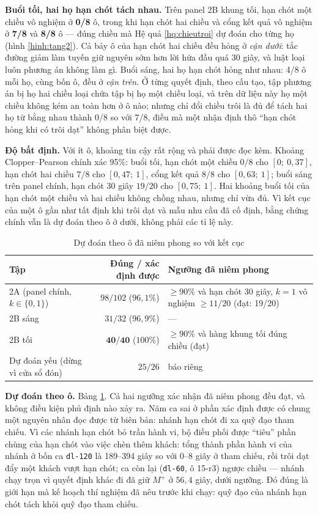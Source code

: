 \textbf{Buổi tối, hai họ hạn chót tách nhau.} Trên panel 2B khung tối, hạn chót một chiều vô nghiệm ở
\textbf{0/8} ô, trong khi hạn chót hai chiều và cổng kết quả vô nghiệm ở \textbf{7/8} và \textbf{8/8}
ô --- đúng chiều mà Hệ quả \ref{hq:chieutroi} dự đoán cho từng họ (hình \ref{hinh:tang2}). Cả bảy ô
của hạn chót hai chiều đều hỏng ở \emph{cận dưới}: tắc đường giảm làm tuyến giữ nguyên sớm hơn lời
hứa đầu quá 30 giây, và luật loại luôn phương án không làm gì. Buổi sáng, hai họ hạn chót hỏng như
nhau: 4/8 ô mỗi họ, cùng bốn ô, đều ở \emph{cận trên}. Ở từng quyết định, theo cấu tạo, tập phương
án bị họ hai chiều loại chứa tập bị họ một chiều loại, và trên dữ liệu này họ một chiều không kém an
toàn hơn ở ô nào; nhưng chỉ đổi chiều trôi là đủ để tách hai họ từ bằng nhau thành 0/8 so với 7/8,
điều mà một nhận định thô ``hạn chót hỏng khi có trôi dạt'' không phân biệt được.

\textbf{Độ bất định.} Với ít ô, khoảng tin cậy rất rộng và phải được đọc kèm. Khoảng Clopper--Pearson
chính xác 95\%: buổi tối, hạn chót một chiều $0/8$ cho $[0;\ 0{,}37]$, hạn chót hai chiều $7/8$ cho
$[0{,}47;\ 1]$, cổng kết quả $8/8$ cho $[0{,}63;\ 1]$; buổi sáng trên panel chính, hạn chót 30 giây
$19/20$ cho $[0{,}75;\ 1]$. Hai khoảng buổi tối của hạn chót một chiều và hai chiều không chồng nhau,
nhưng chỉ vừa đủ. Vì kết cục của một ô gần như tất định khi trôi dạt và mẫu nhu cầu đã cố định, bằng
chứng chính vẫn là dự đoán theo ô ở dưới, không phải các tỉ lệ này.

\begin{table}[htbp]
\centering
\caption{Dự đoán theo ô đã niêm phong so với kết cục}
\label{bang:tang2-dudoan}
\small
\begin{tabular}{@{}lrp{5.2cm}@{}}
\toprule
\textbf{Tập} & \textbf{Đúng / xác định được} & \textbf{Ngưỡng đã niêm phong}\\
\midrule
2A (panel chính, $k \in \{0,1\}$) & $98/102$ ($96{,}1\%$) & $\ge 90\%$ và hạn chót 30 giây, $k=1$ vô
nghiệm $\ge 11/20$ (đạt: 19/20)\\
2B sáng & $31/32$ ($96{,}9\%$) & ---\\
2B tối & $\mathbf{40/40}$ ($100\%$) & $\ge 90\%$ và hàng khung tối đúng chiều (đạt)\\
Dự đoán yếu (dừng vì cửa sổ đón) & $25/26$ & báo riêng\\
\bottomrule
\end{tabular}
\end{table}

\textbf{Dự đoán theo ô.} Bảng \ref{bang:tang2-dudoan}. Cả hai ngưỡng xác nhận đã niêm phong đều đạt,
và không điều kiện phủ định nào xảy ra. Năm ca sai ở phần xác định được có chung một nguyên nhân đọc
được từ biên bản: nhánh hạn chót đi xa quỹ đạo tham chiếu. Vì các nhánh hạn chót bỏ trần hành vi,
bộ điều phối được ``tiêu'' phần chùng của hạn chót vào việc chèn thêm khách: tổng thành phần hành vi
của nhánh ở bốn ca \texttt{dl-120} là 189--394 giây so với 0--8 giây ở tham chiếu, rồi trôi dạt đẩy
một khách vượt hạn chót; ca còn lại (\texttt{dl-60}, ô 15-r3) ngược chiều --- nhánh chạy trọn vì
quyết định khác đi đã giữ $M^{+}$ ở $56{,}4$ giây, dưới ngưỡng. Đó đúng là giới hạn mà kế hoạch thí
nghiệm đã nêu trước khi chạy: quỹ đạo của nhánh hạn chót tách khỏi quỹ đạo tham chiếu.

